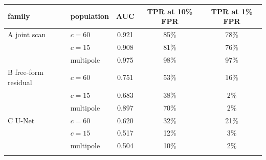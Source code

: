 \begin{tabular}{@{}llccc@{}}
\toprule
family & population & AUC & TPR at 10\% FPR & TPR at 1\% FPR \\
\midrule
A joint scan & $c{=}60$ & 0.921 & 85\% & 78\% \\
 & $c{=}15$ & 0.908 & 81\% & 76\% \\
 & multipole & 0.975 & 98\% & 97\% \\
\addlinespace[2pt]
B free-form residual & $c{=}60$ & 0.751 & 53\% & 16\% \\
 & $c{=}15$ & 0.683 & 38\% & 2\% \\
 & multipole & 0.897 & 70\% & 2\% \\
\addlinespace[2pt]
C U-Net & $c{=}60$ & 0.620 & 32\% & 21\% \\
 & $c{=}15$ & 0.517 & 12\% & 3\% \\
 & multipole & 0.504 & 10\% & 2\% \\
\addlinespace[2pt]
\bottomrule
\end{tabular}
